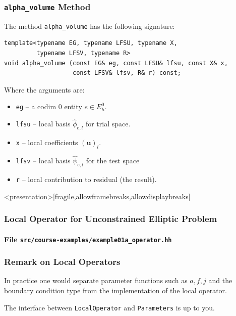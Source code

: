 \begin{frame}[fragile]
\frametitle{\lstinline{alpha_volume} Method}
The method \lstinline{alpha_volume} has the following signature: 
\begin{lstlisting}[basicstyle=\scriptsize]
template<typename EG, typename LFSU, typename X, 
         typename LFSV, typename R>
void alpha_volume (const EG& eg, const LFSU& lfsu, const X& x, 
                   const LFSV& lfsv, R& r) const;
\end{lstlisting}
Where the arguments are:
\begin{itemize}
\item \lstinline{eg} -- a codim 0 entity $e\in E_h^0$.
\item \lstinline{lfsu} -- local basis $\hat\phi_{e,l}$ for trial space.
\item \lstinline{x} -- local coefficients $(\mathbf{u})_l$.
\item \lstinline{lfsv} -- local basis $\hat\psi_{e,l}$ for the test space 
\item \lstinline{r} -- local contribution to residual (the result).
\end{itemize}
\end{frame}


\begin{frame}<presentation>[fragile,allowframebreaks,allowdisplaybreaks]
\frametitle<presentation>{Local Operator for Unconstrained Elliptic Problem}
\framesubtitle<presentation>{File \texttt{src/course-examples/example01a\_operator.hh}}

\end{frame}

\begin{frame}
\frametitle{Remark on Local Operators}
In practice one would separate parameter functions such as $a, f, j$ and the boundary condition
type from the implementation of the local operator.

\begin{center}
\end{center}
The interface between \lstinline{LocalOperator} and \lstinline{Parameters} is up to you.
\end{frame}


